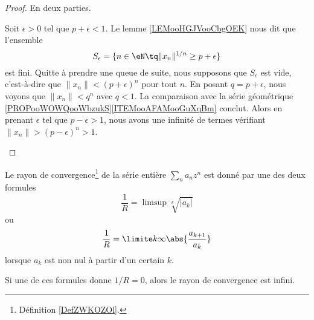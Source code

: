 \begin{proof}
	En deux parties.
	\begin{subproof}
		Soit \( \epsilon>0\) tel que \( p+\epsilon<1\). Le lemme \ref{LEMooHGJVooCbgOEK} nous dit que l'ensemble
		\begin{equation}
			S_{\epsilon}=\{ n\in \eN\tq \| x_n \|^{1/n}\geq p+\epsilon \}
		\end{equation}
		est fini. Quitte à prendre une queue de suite, nous supposons que \( S_{\epsilon}\) est vide, c'est-à-dire que \( \| x_n \|<(p+\epsilon)^n\) pour tout \( n\). En posant \( q=p+\epsilon\), nous voyons que \( \| x_n \|<q^n\) avec \( q<1\). La comparaison avec la série géométrique \ref{PROPooWOWQooWbzukS}\ref{ITEMooAFAMooGuXqBm} conclut.
		Alors en prenant \( \epsilon\) tel que \( p-\epsilon>1\), nous avons une infinité de termes vérifiant \( \| x_n \|>(p-\epsilon)^n>1\).
	\end{subproof}
\end{proof}

\begin{theorem} \label{ThoSerPuissRap}
	Le rayon de convergence\footnote{Définition \ref{DefZWKOZOl}.} de la série entière \( \sum_n a_n z^n\) est donné par une des deux formules
	\begin{equation}		\label{EqRayCOnvSer}
		\frac{1}{ R } =\limsup\sqrt[k]{| a_k |}
	\end{equation}
	ou
	\begin{equation}		\label{EqAlphaSerPuissAtern}
		\frac{1}{ R }=\limite k \infty \abs{\frac{a_{k+1}}{a_k}}
	\end{equation}
	lorsque \( a_k\) est non nul à partir d'un certain \( k\).

	Si une de ces formules donne \( 1/R=0\), alors le rayon de convergence est infini.
\end{theorem}

